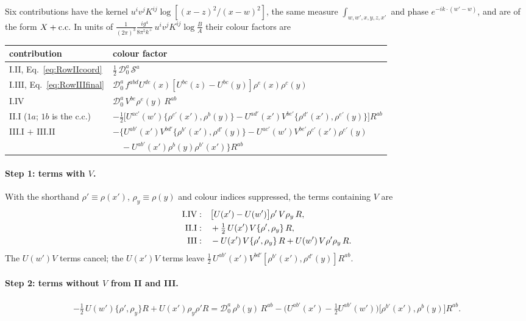 \documentclass[10pt]{article}
\numberwithin{equation}{section}
\begin{document}
Six contributions have the kernel $u^{i}v^{j}K^{ij}\log[(x-z)^{2}/(x-w)^{2}]$, the same measure $\int_{w,w',x,y,z,x'}$ and phase $e^{-ik\cdot(w'-w)}$, and are of the form $X+{\rm c.c.}$ In units of
$\frac{1}{(2\pi)^{3}}\frac{ig^{4}}{8\pi^{5}k^{+}}\,u^{i}v^{j}K^{ij}\log\frac{B}{A}$ their colour factors are
\begin{center}
\renewcommand{\arraystretch}{1.3}
\begin{tabular}{p{3.2cm}|l}
contribution & colour factor\\ \hline
I.II, Eq.~\eqref{eq:RowIIcoord} & $\tfrac12\,\mathcal{D}_{0}^{a}\,\mathcal{S}^{a}$\\
I.III, Eq.~\eqref{eq:RowIIIfinal} & $\mathcal{D}_{0}^{a}\,f^{abd}U^{de}(x)[U^{bc}(z)-U^{bc}(y)]\rho^{e}(x)\rho^{c}(y)$\\
I.IV & $\mathcal{D}_{0}^{a}\,V^{be}\rho^{e}(y)\,R^{ab}$\\
II.I ($1a$; $1b$ is the c.c.) & $-\tfrac12\big[U^{ac'}(w')\{\rho^{c'}(x'),\rho^{b}(y)\}-U^{ad'}(x')V^{be'}\{\rho^{d'}(x'),\rho^{e'}(y)\}\big]R^{ab}$\\
III.I $+$ III.II & $-\big\{U^{ab'}(x')V^{bd'}\{\rho^{b'}(x'),\rho^{d'}(y)\}-U^{ac'}(w')V^{be'}\rho^{c'}(x')\rho^{e'}(y)$\\
 & $\quad-U^{ab'}(x')\rho^{b}(y)\rho^{b'}(x')\big\}R^{ab}$
\end{tabular}
\end{center}

\paragraph{Step 1: terms with $V$.} With the shorthand $\rho'\equiv\rho(x')$, $\rho_{y}\equiv\rho(y)$ and colour indices suppressed, the terms containing $V$ are
\begin{align}
\text{I.IV}:&\quad\big[U(x')-U(w')\big]\rho'\,V\rho_{y}\,R, \notag\\
\text{II.I}:&\quad+\tfrac12\,U(x')\,V\{\rho',\rho_{y}\}\,R, \notag\\
\text{III}:&\quad-U(x')\,V\{\rho',\rho_{y}\}\,R+U(w')\,V\rho'\rho_{y}\,R .
\end{align}
The $U(w')V$ terms cancel; the $U(x')V$ terms leave $\tfrac12\,U^{ab'}(x')V^{bd'}[\rho^{b'}(x'),\rho^{d'}(y)]R^{ab}$.

\paragraph{Step 2: terms without $V$ from II and III.}
\begin{align}
-\tfrac12\,U(w')\{\rho',\rho_{y}\}R+U(x')\rho_{y}\rho'R
=\mathcal{D}_{0}^{a}\,\rho^{b}(y)\,R^{ab}-\Big(U^{ab'}(x')-\tfrac12U^{ab'}(w')\Big)\big[\rho^{b'}(x'),\rho^{b}(y)\big]R^{ab}.
\end{align}
\end{document}
